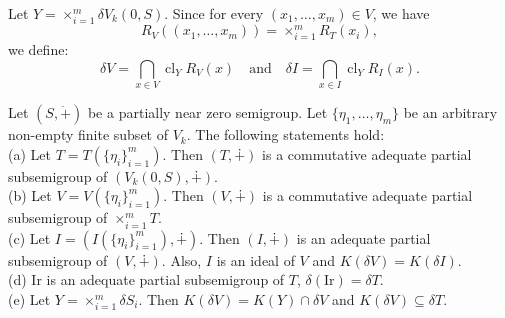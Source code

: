 \documentclass[twoside,11pt]{article}
\begin{document}
Let $Y = \times_{i=1}^m \delta V_k(0,S)$. Since for every $(x_1,\ldots,x_m) \in V$, we have 
\[
R_V((x_1,\ldots,x_m)) = \times_{i=1}^m R_T(x_i),
\] 
we define:
\[
\delta V = \bigcap_{x \in V} \operatorname{cl}_Y R_V(x)
\quad \text{and} \quad
\delta I = \bigcap_{x \in I} \operatorname{cl}_Y R_I(x).
\]

\begin{lemma} \label{asli}
	Let $(S,\dot{+})$ be a partially near zero semigroup. Let $\{\eta_1,\ldots,\eta_m\}$ be an arbitrary non-empty finite subset of $V_k$. The following statements hold:\\
	(a) Let $T = T(\{\eta_i\}_{i=1}^m)$. Then $(T,\dotplus)$ is a commutative adequate  partial subsemigroup of $(V_k(0,S),\dotplus)$.\\
	(b) Let $V = V(\{\eta_i\}_{i=1}^m)$. Then $(V,\dotplus)$ is a commutative adequate  partial subsemigroup of $\times_{i=1}^m T$.\\
	(c) Let $I = (I(\{\eta_i\}_{i=1}^m),\dotplus)$. Then $(I,\dotplus)$ is an adequate partial subsemigroup of $(V,\dotplus)$. Also, $I$ is an ideal of $V$ and $K(\delta V) = K(\delta I)$.\\
	(d) $\mathrm{Ir}$ is an adequate partial subsemigroup of $T$, $\delta (\mathrm{Ir}) = \delta T$.\\
	(e) Let $Y = \times_{i=1}^m \delta S_i$. Then $K(\delta V) = K(Y) \cap \delta V$ and $K(\delta V)\subseteq \delta T$.
\end{lemma}
\end{document}
